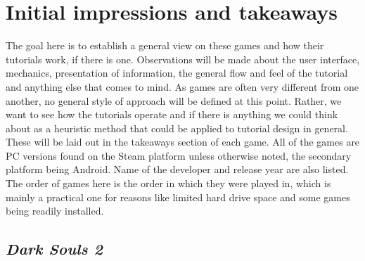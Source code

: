 \section{Initial impressions and takeaways}

The goal here is to establish a general view on these games and how their tutorials work, if there is one. Observations will be made about the user interface, mechanics, presentation of information, the general flow and feel of the tutorial and anything else that comes to mind. As games are often very different from one another, no general style of approach will be defined at this point. Rather, we want to see how the tutorials operate and if there is anything we could think about as a heuristic method that could be applied to tutorial design in general. These will be laid out in the takeaways section of each game. All of the games are PC versions found on the Steam platform unless otherwise noted, the secondary platform being Android. Name of the developer and release year are also listed. The order of games here is the order in which they were played in, which is mainly a practical one for reasons like limited hard drive space and some games being readily installed.  

\subsection{\textit{Dark Souls 2}}
